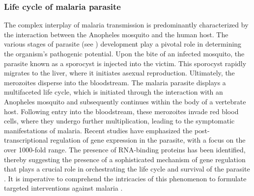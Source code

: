 \subsubsection{Life cycle of malaria parasite}
The complex interplay of malaria transmission is predominantly characterized by the interaction between the Anopheles mosquito and the human host. The various stages of parasite (see ) development play a pivotal role in determining the organism's pathogenic potential. Upon the bite of an infected mosquito, the parasite known as a sporocyst is injected into the victim. This sporocyst rapidly migrates to the liver, where it initiates asexual reproduction. Ultimately, the merozoites disperse into the bloodstream. The malaria parasite displays a multifaceted life cycle, which is initiated through the interaction with an Anopheles mosquito and subsequently continues within the body of a vertebrate host. Following entry into the bloodstream, these merozoites invade red blood cells, where they undergo further multiplication, leading to the symptomatic manifestations of malaria. Recent studies have emphasized the post-transcriptional regulation of gene expression in the parasite, with a focus on the over \num{1000}-fold range. The presence of RNA-binding proteins has been identified, thereby suggesting the presence of a sophisticated mechanism of gene regulation that plays a crucial role in orchestrating the life cycle and survival of the parasite \cite{Bunnik2016}. It is imperative to comprehend the intricacies of this phenomenon to formulate targeted interventions against malaria \cite{Linzke2019}.
